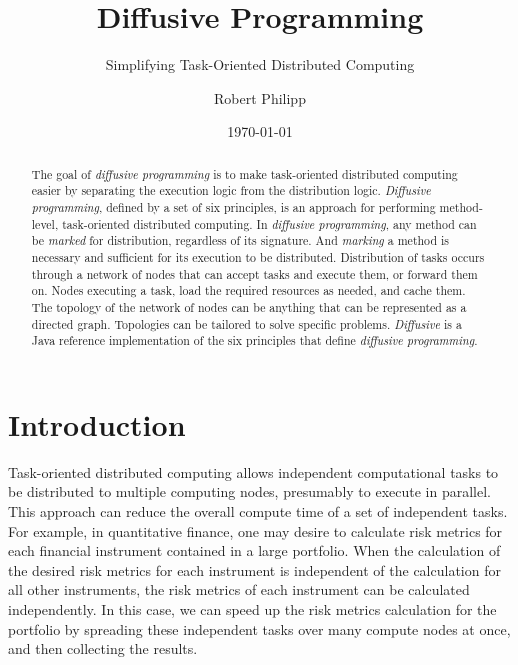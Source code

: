 \documentclass[11pt]{scrartcl}
\begin{document}
\title{Diffusive Programming}
\subtitle{Simplifying Task-Oriented Distributed Computing}
\author{Robert Philipp}
\date{\today}
\maketitle

%
%
\begin{abstract}
The goal of \emph{diffusive programming} is to make task-oriented distributed computing easier by separating the execution logic from the distribution logic. \emph{Diffusive programming}, defined by a set of six principles, is an approach for performing method-level, task-oriented distributed computing. In \emph{diffusive programming}, any method can be \emph{marked} for distribution, regardless of its signature. And \emph{marking} a method is necessary and sufficient for its execution to be distributed. Distribution of tasks occurs through a network of nodes that can accept tasks and execute them, or forward them on. Nodes executing a task, load the required resources as needed, and cache them. The topology of the network of nodes can be anything that can be represented as a directed graph. Topologies can be tailored to solve specific problems. \emph{Diffusive} is a Java reference implementation of the six principles that define \emph{diffusive programming}.
\end{abstract}

%
%
\section{Introduction}
Task-oriented distributed computing allows independent computational tasks to be distributed to multiple computing nodes, presumably to execute in parallel. This approach can reduce the overall compute time of a set of independent tasks. For example, in quantitative finance, one may desire to calculate risk metrics for each financial instrument contained in a large portfolio. When the calculation of the desired risk metrics for each instrument is independent of the calculation for all other instruments, the risk metrics of each instrument can be calculated independently. In this case, we can speed up the risk metrics calculation for the portfolio by spreading these independent tasks over many compute nodes at once, and then collecting the results.
\end{document}
